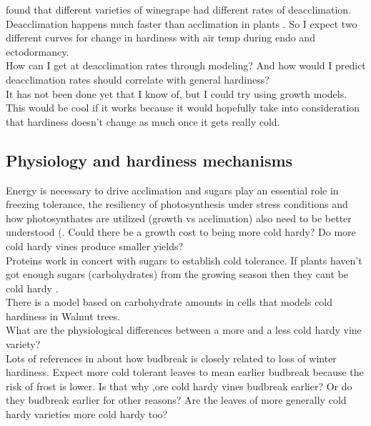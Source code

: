 \documentclass[11pt,letter]{article}
\begin{document}
\cite{Kovaleski2018a} found that different varieties of winegrape had different rates of deacclimation. \\ 

Deacclimation happens much faster than acclimation in plants \citep{Kalberer2006}. So I expect two different curves for change in hardiness with air temp during endo and ectodormancy. \\ 

How can I get at deacclimation rates through modeling? And how would I predict deacclimation rates should correlate with general hardiness?\\

It has not been done yet that I know of, but I could try using growth models. This would be cool if it works because it would hopefully take into consideration that hardiness doesn't change as much once it gets really cold.\\ 

\subsection{Physiology and hardiness mechanisms}  
Energy is necessary to drive acclimation and sugars play an essential role in freezing tolerance, the
resiliency of photosynthesis under stress conditions and how photosynthates are utilized (growth vs acclimation) also need to be better understood (\citep{Gusta2013}. Could there be a growth cost to being more cold hardy? Do more cold hardy vines produce smaller yields? \\

Proteins work in concert with sugars to establish cold tolerance. If plants haven't got enough sugars (carbohydrates) from the growing season then they cant be cold hardy \citep{Gusta2013}. \\

There is a model based on carbohydrate amounts in cells that models cold hardiness in Walnut trees. \\ 

What are the physiological differences between a more and a less cold hardy vine variety? \\

Lots of references in \cite{Lenz2016} about how budbreak is closely related to loss of winter hardiness. Expect more cold tolerant leaves to mean earlier budbreak because the risk of frost is lower. Is that why ,ore cold hardy vines budbreak earlier? Or do they budbreak earlier for other reasons? Are the leaves of more generally cold hardy varieties more cold hardy too? \\
  
\end{document}
